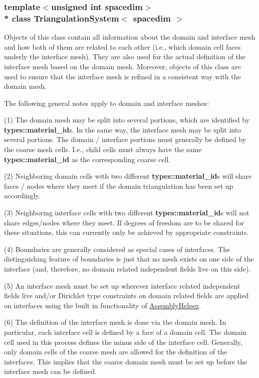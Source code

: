 \subsubsection*{template$<$unsigned int spacedim$>$\\*
class Triangulation\+System$<$ spacedim $>$}

Objects of this class contain all information about the domain and interface mesh and how both of them are related to each other (i.\+e., which domain cell faces underly the interface mesh). They are also used for the actual definition of the interface mesh based on the domain mesh. Moreover, objects of this class are used to ensure that the interface mesh is refined in a consistent way with the domain mesh.

The following general notes apply to domain and interface meshes\+:

(1) The domain mesh may be split into several portions, which are identified by {\bf types\+::material\+\_\+id}s. In the same way, the interface mesh may be split into several portions. The domain / interface portions must generally be defined by the coarse mesh cells. I.\+e., child cells must always have the same {\bf types\+::material\+\_\+id} as the corresponding coarse cell.

(2) Neighboring domain cells with two different {\bf types\+::material\+\_\+id}s will share faces / nodes where they meet if the domain triangulation has been set up accordingly.

(3) Neighboring interface cells with two different {\bf types\+::material\+\_\+id}s will not share edges/nodes where they meet. If degrees of freedom are to be shared for these situations, this can currently only be achieved by appropriate constraints.

(4) Boundaries are generally considered as special cases of interfaces. The distinguishing feature of boundaries is just that no mesh exists on one side of the interface (and, therefore, no domain related independent fields live on this side).

(5) An interface mesh must be set up wherever interface related independent fields live and/or Dirichlet type constraints on domain related fields are applied on interfaces using the built in functionality of \hyperlink{class_assembly_helper}{Assembly\+Helper}.

(6) The definition of the interface mesh is done via the domain mesh. In particular, each interface cell is defined by a face of a domain cell. The domain cell used in this process defines the minus side of the interface cell. Generally, only domain cells of the coarse mesh are allowed for the definition of the interfaces. This implies that the coarse domain mesh must be set up before the interface mesh can be defined.

